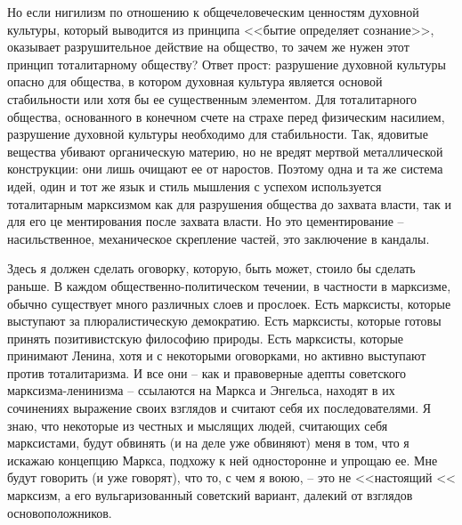 \documentclass{book}
\begin{document}
Но если нигилизм по отношению к общечеловеческим ценностям духовной культуры, который выводится из принципа <<бытие определяет 
сознание>>, оказывает разрушительное действие на общество, то зачем же нужен этот принцип тоталитарному обществу?
Ответ прост: разрушение духовной культуры опасно для общества, в котором духовная культура является основой стабильности или 
хотя бы ее существенным элементом. Для тоталитарного общества, основанного в конечном счете на страхе перед физическим насилием, 
разрушение духовной культуры необходимо для стабильности. Так, ядовитые вещества убивают органическую материю, но не вредят 
мертвой металлической конструкции: они лишь очищают ее от наростов. Поэтому одна и та же система идей, один и тот же язык и 
стиль мышления с успехом используется тоталитарным марксизмом как для разрушения общества до захвата власти, так и для его це­
ментирования после захвата власти. Но это цементирование -- насильственное, механическое скрепление частей, это заклю­чение в 
кандалы.

Здесь я должен сделать оговорку, которую, быть может, стоило бы сделать раньше. В каждом общественно-политиче­ском течении, в 
частности в марксизме, обычно существует много различных слоев и прослоек. Есть марксисты, которые выступают за плюралистическую 
демократию. Есть марксисты, которые готовы принять позитивистскую философию природы. Есть марксисты, которые принимают Ленина, 
хотя и с некоторыми оговорками, но активно выступают против тоталитаризма. И все они -- как и правоверные адепты советского 
марксизма-ленинизма -- ссылаются на Маркса и Энгельса, находят в их сочинениях выражение своих взглядов и считают себя их 
последователями. Я знаю, что некоторые из честных и мыслящих людей, считающих себя марксистами, будут обвинять (и на деле уже 
обвиняют) меня в том, что я искажаю концеп­цию Маркса, подхожу к ней односторонне и упрощаю ее. Мне будут говорить (и уже 
говорят), что то, с чем я воюю, -- это не <<настоящий << марксизм, а его вульгаризованный советский вариант, далекий от взглядов 
основоположников.
\end{document}
